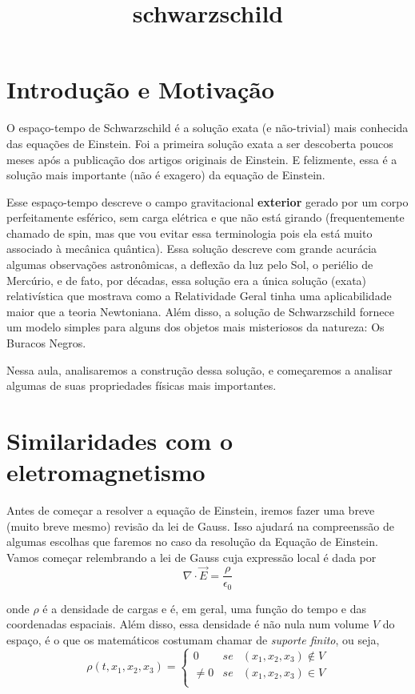 \documentclass[11pt]{article}
\title{schwarzschild}
\begin{document}
    


    \hypertarget{introduuxe7uxe3o-e-motivauxe7uxe3o}{%
\section{Introdução e
Motivação}\label{introduuxe7uxe3o-e-motivauxe7uxe3o}}

    O espaço-tempo de Schwarzschild é a solução exata (e não-trivial) mais
conhecida das equações de Einstein. Foi a primeira solução exata a ser
descoberta poucos meses após a publicação dos artigos originais de
Einstein. E felizmente, essa é a solução mais importante (não é exagero)
da equação de Einstein.

Esse espaço-tempo descreve o campo gravitacional \textbf{exterior}
gerado por um corpo perfeitamente esférico, sem carga elétrica e que não
está girando (frequentemente chamado de spin, mas que vou evitar essa
terminologia pois ela está muito associado à mecânica quântica). Essa
solução descreve com grande acurácia algumas observações astronômicas, a
deflexão da luz pelo Sol, o periélio de Mercúrio, e de fato, por
décadas, essa solução era a única solução (exata) relativística que
mostrava como a Relatividade Geral tinha uma aplicabilidade maior que a
teoria Newtoniana. Além disso, a solução de Schwarzschild fornece um
modelo simples para alguns dos objetos mais misteriosos da natureza: Os
Buracos Negros.

Nessa aula, analisaremos a construção dessa solução, e começaremos a
analisar algumas de suas propriedades físicas mais importantes.

    \hypertarget{similaridades-com-o-eletromagnetismo}{%
\section{Similaridades com o
eletromagnetismo}\label{similaridades-com-o-eletromagnetismo}}

    Antes de começar a resolver a equação de Einstein, iremos fazer uma
breve (muito breve mesmo) revisão da lei de Gauss. Isso ajudará na
compreenssão de algumas escolhas que faremos no caso da resolução da
Equação de Einstein. Vamos começar relembrando a lei de Gauss cuja
expressão local é dada por
\[ \tag{2.1} \nabla \cdot \vec{E} = \frac{\rho}{\epsilon_0}\]

onde \(\rho\) é a densidade de cargas e é, em geral, uma função do tempo
e das coordenadas espaciais. Além disso, essa densidade é não nula num
volume \(V\) do espaço, é o que os matemáticos costumam chamar de
\emph{suporte finito}, ou seja,
\[\tag{2.2} \rho(t, x_1, x_2, x_3) = \left\{\begin{array}{lll}
 0 &se& (x_1, x_2, x_3) \notin V \\
 \neq 0 &se& (x_1, x_2, x_3) \in V \\
\end{array}\right. \]
\end{document}

